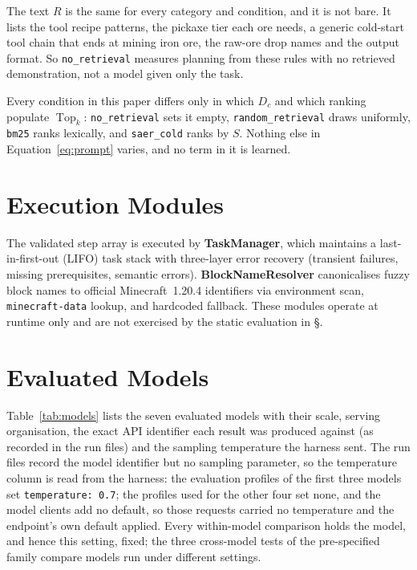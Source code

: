 \documentclass[letterpaper]{article} %
\newcommand{\bodyref}[1]{\getrefnumber{#1}}
\begin{document}
The text $R$ is the same for every category and condition, and it is not
bare.  It lists the tool recipe patterns, the pickaxe tier each ore needs, a
generic cold-start tool chain that ends at mining iron ore, the raw-ore drop names and
the output format.  So \texttt{no\_retrieval} measures planning from these
rules with no retrieved demonstration, not a model given only the task.

Every condition in this paper differs only in which $D_c$ and which
ranking populate $\operatorname{Top}_k$: \texttt{no\_retrieval} sets it
empty, \texttt{random\_retrieval} draws uniformly, \texttt{bm25} ranks
lexically, and \texttt{saer\_cold} ranks by $S$.  Nothing else in
Equation~\ref{eq:prompt} varies, and no term in it is learned.

\section{Execution Modules}
\label{sec:exec}

The validated step array is executed by \textbf{TaskManager}, which
maintains a last-in-first-out (LIFO) task stack with three-layer error recovery (transient
failures, missing prerequisites, semantic errors).
\textbf{BlockNameResolver} canonicalises fuzzy block names to official
Minecraft~1.20.4 identifiers via environment scan,
\texttt{minecraft-data} lookup, and hardcoded fallback.  These modules
operate at runtime only and are not exercised by the static evaluation
in \S\bodyref{sec:protocol}.

\section{Evaluated Models}
\label{app:models}
Table~\ref{tab:models} lists the seven evaluated models with their scale,
serving organisation, the exact API identifier each result was produced
against (as recorded in the run files) and the sampling temperature the
harness sent.  The run files record the model identifier but no sampling
parameter, so the temperature column is read from the harness: the evaluation
profiles of the first three models set \texttt{temperature: 0.7}; the profiles
used for the other four set none, and the model clients add no default, so
those requests carried no temperature and the endpoint's own default applied.
Every within-model comparison holds the model, and hence this setting, fixed;
the three cross-model tests of the pre-specified family compare models run
under different settings.
\end{document}
